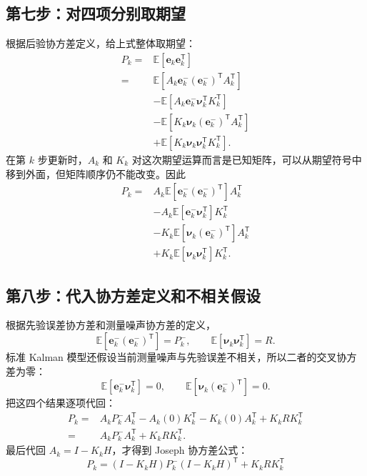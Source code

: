 \documentclass[UTF8,a4paper,11pt]{ctexart}
\newcommand{\prior}{^{-}}
\newcommand{\transpose}{^{\mathsf T}}
\begin{document}
\subsection*{第七步：对四项分别取期望}

根据后验协方差定义，给上式整体取期望：
\begin{align}
P_k
={}&\mathbb E[\bm e_k\bm e_k\transpose]\\
={}&\mathbb E[
A_k\bm e_k\prior(\bm e_k\prior)\transpose A_k\transpose]\\
&-\mathbb E[
A_k\bm e_k\prior\bm\nu_k\transpose K_k\transpose]\\
&-\mathbb E[
K_k\bm\nu_k(\bm e_k\prior)\transpose A_k\transpose]\\
&+\mathbb E[
K_k\bm\nu_k\bm\nu_k\transpose K_k\transpose].
\end{align}
在第 $k$ 步更新时，$A_k$ 和 $K_k$ 对这次期望运算而言是已知矩阵，可以从期望符号中移到外面，但矩阵顺序仍不能改变。因此
\begin{align}
P_k
={}&A_k\mathbb E[\bm e_k\prior(\bm e_k\prior)\transpose]A_k\transpose\\
&-A_k\mathbb E[\bm e_k\prior\bm\nu_k\transpose]K_k\transpose\\
&-K_k\mathbb E[\bm\nu_k(\bm e_k\prior)\transpose]A_k\transpose\\
&+K_k\mathbb E[\bm\nu_k\bm\nu_k\transpose]K_k\transpose.
\end{align}

\subsection*{第八步：代入协方差定义和不相关假设}

根据先验误差协方差和测量噪声协方差的定义，
\begin{equation}
\mathbb E[\bm e_k\prior(\bm e_k\prior)\transpose]=P_k\prior,
\qquad
\mathbb E[\bm\nu_k\bm\nu_k\transpose]=R.
\end{equation}
标准 Kalman 模型还假设当前测量噪声与先验误差不相关，所以二者的交叉协方差为零：
\begin{equation}
\mathbb E[\bm e_k\prior\bm\nu_k\transpose]=0,
\qquad
\mathbb E[\bm\nu_k(\bm e_k\prior)\transpose]=0.
\end{equation}
把这四个结果逐项代回：
\begin{align}
P_k
={}&A_kP_k\prior A_k\transpose
-A_k(0)K_k\transpose
-K_k(0)A_k\transpose
+K_kRK_k\transpose\\
={}&A_kP_k\prior A_k\transpose+K_kRK_k\transpose.
\end{align}
最后代回 $A_k=I-K_kH$，才得到 Joseph 协方差公式：
\begin{equation}
\boxed{P_k
=(I-K_kH)P_k\prior(I-K_kH)\transpose
+K_kRK_k\transpose}
\label{eq:joseph}
\end{equation}
\end{document}
